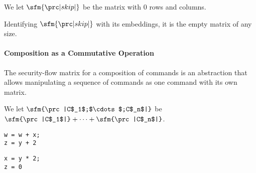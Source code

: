
\begin{definition}[Skip]
We let $\sfm{\prc|skip|}$ be the matrix with $0$ rows and columns.
\end{definition}

Identifying $\sfm{\prc|skip|}$ with its embeddings, it is the empty matrix of any size.

\paragraph{Composition as a Commutative Operation }

The security-flow matrix for a composition of commands is an abstraction that allows manipulating a sequence of commands as one command with its own matrix.

\begin{definition}[Composition]
We let $\sfm{\prc|C$_1$;$\cdots$;C$_n$|}$
be $\sfm{\prc|C$_1$|} + \cdots + \sfm{\prc|C$_n$|}$.
\end{definition}

\newsavebox\cone
\begin{lrbox}{\cone}
\begin{lstlisting}
w = w + x;
z = y + 2
\end{lstlisting}
\end{lrbox}
\newsavebox\ctwo
\begin{lrbox}{\ctwo}
\begin{lstlisting}
x = y * 2;
z = 0
\end{lstlisting}
\end{lrbox}

